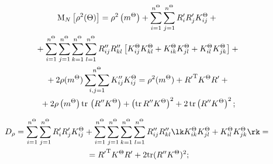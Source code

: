 \vspace*{-12pt}



\noindent

\begin{multline}

\mathrm{M}_N \left[ \rho^2 (\Theta)\right] =\rho^2 \left(m^\Theta\right) +\sum\limits_{i=1}^{n^\Theta} \sum\limits_{j=1}^{n^\Theta}

R_i' R_j' K_{ij}^\Theta+ {}\\

{}+\sum\limits_{i=1}^{n^\Theta} \sum\limits_{j=1}^{n^\Theta} \sum\limits_{k=1}^{n^\Theta} \sum\limits_{l=1}^{n^\Theta}

 R_{ij}'' R_{kl}''  \left[ K_{ij}^\Theta K_{kl}^\Theta + K_{ik}^\Theta K_{jl}^\Theta + 

K_{il}^\Theta K_{jk}^\Theta \right] +{}\\

{}+2\rho (m^\Theta) \smsm_{i,j=1}^{n^\Theta} 

K_{ij}'' K_{ij}^\Theta = \rho^2 (m^\Theta) + {R'}^{\mathrm{T}} K^\Theta R' +{}\\

{}+2\rho\left(m^\Theta\right) \mathrm{tr}\, \left(R'' K^\Theta\right)+ \left(\mathrm{tr}\, R'' K^\Theta\right)^2 + 2 \,\mathrm{tr}\left(R'' 

K^\Theta\right)^2;

\label{e4.13-sin}

\end{multline}



\vspace*{-12pt}



\noindent

\begin{multline}

 D_\rho= \sum\limits_{i=1}^{n^\Theta} \sum\limits_{j=1}^{n^\Theta} R_i' R_j' K_{ij}^\Theta+

 \sum\limits_{i=1}^{n^\Theta} \sum\limits_{j=1}^{n^\Theta} \sum\limits_{k=1}^{n^\Theta} \sum\limits_{l=1}^{n^\Theta} R_{ij}'' R_{kl}'' 

 \lk K_{ik}^\Theta K_{jl}^\Theta + K_{il}^\Theta K_{jk}^\Theta  

\rk={}\\

{}= {R'}^{\mathrm{T}} K^\Theta R' +2 {\rm tr}(R'' K^\Theta)^2;

\label{e4.14-sin}

\end{multline}



